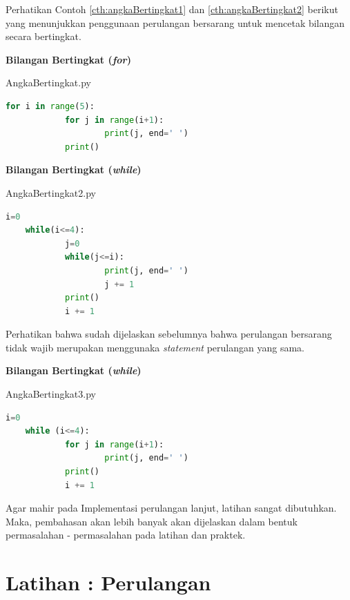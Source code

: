 Perhatikan Contoh \ref{cth:angkaBertingkat1} dan \ref{cth:angkaBertingkat2} berikut yang menunjukkan penggunaan perulangan bersarang untuk mencetak bilangan secara bertingkat. 

\begin{contoh}
	\textbf{Bilangan Bertingkat (\textit{for})}
	\label{cth:angkaBertingkat1}
\begin{listprog}{AngkaBertingkat.py}
\label{lst:angkaBertingkat}
\begin{lstlisting}[language=Python]
	for i in range(5):
			for j in range(i+1):
					print(j, end=' ')
			print()
	\end{lstlisting}
\end{listprog}
\end{contoh}

\begin{contoh}
	\textbf{Bilangan Bertingkat (\textit{while})}
	\label{cth:angkaBertingkat2}
\begin{listprog}{AngkaBertingkat2.py}
\label{lst:angkaBertingkat2}
\begin{lstlisting}[language=Python]
	i=0
	while(i<=4):
			j=0    
			while(j<=i):
					print(j, end=' ')
					j += 1
			print()
			i += 1
	\end{lstlisting}
\end{listprog}
\end{contoh}

Perhatikan bahwa sudah dijelaskan sebelumnya bahwa perulangan bersarang tidak wajib merupakan menggunaka \textit{statement} perulangan yang sama.

\begin{contoh}
	\textbf{Bilangan Bertingkat (\textit{while})}
	\label{cth:angkaBertingkat3}
\begin{listprog}{AngkaBertingkat3.py}
\label{lst:angkaBertingkat3}
\begin{lstlisting}[language=Python]
	i=0
	while (i<=4):
			for j in range(i+1):
					print(j, end=' ')
			print()
			i += 1
	\end{lstlisting}
\end{listprog}
\end{contoh}



Agar mahir pada Implementasi perulangan lanjut, latihan sangat dibutuhkan. Maka, pembahasan akan lebih banyak akan dijelaskan dalam bentuk permasalahan - permasalahan pada latihan dan praktek. 

\section{Latihan : Perulangan}

